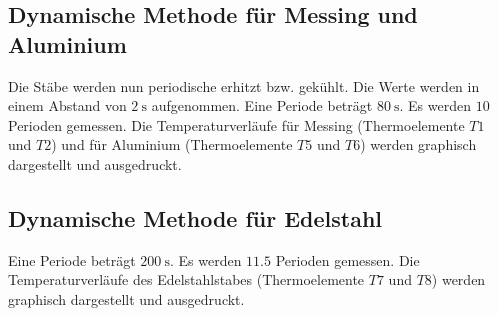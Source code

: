 \subsection{Dynamische Methode für Messing und Aluminium}
Die Stäbe werden nun periodische erhitzt bzw. gekühlt.
Die Werte werden in einem Abstand von $\SI{2}{\second}$ aufgenommen.
Eine Periode beträgt $\SI{80}{\second}$. Es werden $\num{10}$ Perioden
gemessen. %
Die Temperaturverläufe für Messing (Thermoelemente $T1$ und $T2$)
und für Aluminium (Thermoelemente $T5$ und $T6$)
werden graphisch dargestellt und ausgedruckt.

\subsection{Dynamische Methode für Edelstahl}
Eine Periode beträgt $\SI{200}{\second}$.
Es werden $\num{11.5}$ Perioden gemessen.
Die Temperaturverläufe des Edelstahlstabes (Thermoelemente $T7$ und $T8$)
werden graphisch dargestellt und ausgedruckt.